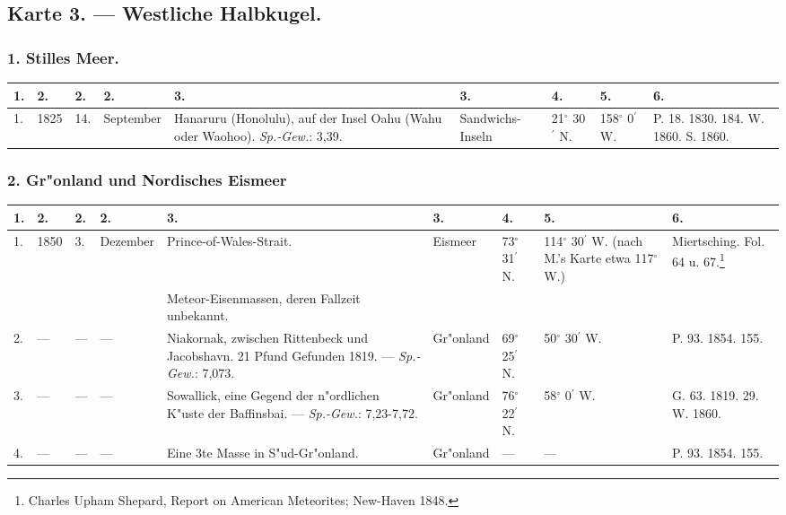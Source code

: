 \documentclass[a4paper, 8pt, oneside, polutonikogreek, german]{article}
\begin{document}
\subsection{Karte 3. --- Westliche Halbkugel.}
\subsubsection{1. Stilles Meer.}
\begin{table}[H]
    \centering
    \footnotesize
    \begin{longtable}{|p{3mm}|p{5mm}|p{4mm}|p{13mm}|p{22mm}|p{14mm}|p{10mm}|p{10mm}|p{13mm}|}
    \hline
        1. & 2. & 2. & 2. & 3. & 3. & 4. & 5. & 6. \\ \hline
        1. & 1825 & 14. & September & Hanaruru (Honolulu), auf der Insel Oahu (Wahu oder Waohoo). \emph{Sp.-Gew.}: 3,39. & Sandwichs-Inseln & 21$^\circ$ 30$^\prime$ N. & 158$^\circ$ 0$^\prime$ W. & P. 18. 1830. 184. W. 1860. S. 1860. \\ \hline
    \end{longtable}
\end{table}
\subsubsection{2. Gr"onland und Nordisches Eismeer}
\begin{table}[H]
    \centering
    \footnotesize
    \begin{longtable}{|p{3mm}|p{5mm}|p{3mm}|p{11mm}|p{28mm}|p{12mm}|p{10mm}|p{12mm}|p{14mm}|}
    \hline
        1. & 2. & 2. & 2. & 3. & 3. & 4. & 5. & 6. \\ \hline
        1. & 1850 & 3. & Dezember & Prince-of-Wales-Strait. & Eismeer & 73$^\circ$ 31$^\prime$ N. & 114$^\circ$ 30$^\prime$ W. (nach M.'s Karte etwa 117$^\circ$ W.) & Miertsching. Fol. 64 u. 67.\footnote{Charles Upham Shepard, Report on American Meteorites; New-Haven 1848.} \\ \hline
          &   &   &   & Meteor-Eisenmassen, deren Fallzeit unbekannt. &   &   &   &   \\ \hline
        2. & --- & --- & --- & Niakornak, zwischen Rittenbeck und Jacobshavn. 21 Pfund Gefunden 1819. --- \emph{Sp.-Gew.}: 7,073. & Gr"onland & 69$^\circ$ 25$^\prime$ N. & 50$^\circ$ 30$^\prime$ W. & P. 93. 1854. 155. \\ \hline
        3. & --- & --- & --- & Sowallick, eine Gegend der n"ordlichen K"uste der Baffinsbai. --- \emph{Sp.-Gew.}: 7,23-7,72. & Gr"onland & 76$^\circ$ 22$^\prime$ N. & 58$^\circ$ 0$^\prime$ W. & G. 63. 1819. 29. W. 1860. \\ \hline
        4. & --- & --- & --- & Eine 3te Masse in S"ud-Gr"onland. & Gr"onland & --- & --- & P. 93. 1854. 155. \\ \hline
    \end{longtable}
\end{table}
\end{document}
